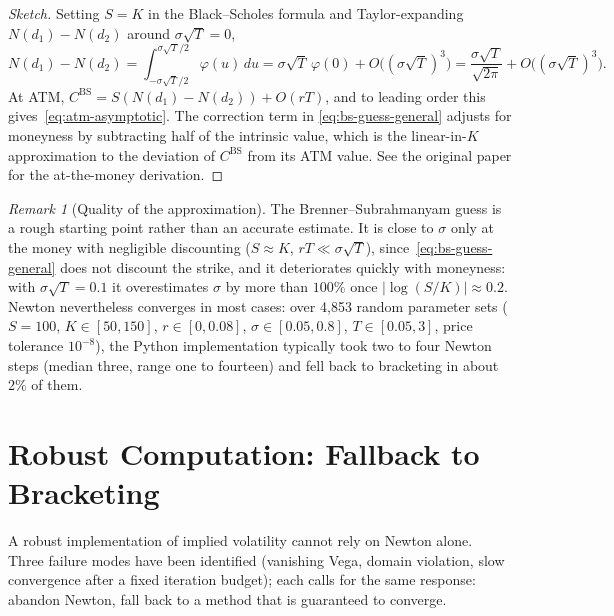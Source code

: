\documentclass[11pt,a4paper]{article}
\theoremstyle{plain}
\theoremstyle{definition}
\theoremstyle{remark}
\newtheorem{remark}[theorem]{Remark}
\newcommand{\BS}{\mathrm{BS}}
\begin{document}
\begin{proof}[Sketch]
Setting \(S = K\) in the Black--Scholes formula and Taylor-expanding
\(N(d_1) - N(d_2)\) around \(\sigma\sqrt{T} = 0\),
\[
    N(d_1) - N(d_2)
    = \int_{-\sigma\sqrt{T}/2}^{\sigma\sqrt{T}/2}\!\varphi(u)\,du
    = \sigma\sqrt{T}\,\varphi(0) + O\bigl((\sigma\sqrt{T})^3\bigr)
    = \frac{\sigma\sqrt{T}}{\sqrt{2\pi}} + O\bigl((\sigma\sqrt{T})^3\bigr).
\]
At ATM, \(C^{\BS} = S(N(d_1) - N(d_2)) + O(rT)\), and to leading
order this gives~\eqref{eq:atm-asymptotic}. The correction term in
\eqref{eq:bs-guess-general} adjusts for moneyness by subtracting half
of the intrinsic value, which is the linear-in-\(K\) approximation
to the deviation of \(C^{\BS}\) from its ATM value. See the original
paper for the at-the-money derivation.
\end{proof}

\begin{remark}[Quality of the approximation]
The Brenner--Subrahmanyam guess is a rough starting point rather than
an accurate estimate. It is close to \(\sigma\) only at the money with
negligible discounting (\(S \approx K\), \(rT \ll \sigma\sqrt{T}\)),
since~\eqref{eq:bs-guess-general} does not discount the strike, and it
deteriorates quickly with moneyness: with \(\sigma\sqrt{T} = 0.1\) it
overestimates \(\sigma\) by more than \(100\%\) once
\(|\log(S/K)| \approx 0.2\). Newton nevertheless converges in most
cases: over 4{,}853 random parameter sets (\(S = 100\),
\(K \in [50, 150]\), \(r \in [0, 0.08]\), \(\sigma \in [0.05, 0.8]\),
\(T \in [0.05, 3]\), price tolerance \(10^{-8}\)), the Python
implementation typically took two to four Newton steps (median three,
range one to fourteen) and fell back to bracketing in about \(2\%\) of
them.
\end{remark}

\section{Robust Computation: Fallback to Bracketing}
\label{sec:fallback}

A robust implementation of implied volatility cannot rely on Newton
alone. Three failure modes have been identified
(vanishing Vega, domain violation, slow convergence after a fixed
iteration budget); each calls for the same response: abandon Newton,
fall back to a method that is guaranteed to converge.
\end{document}
